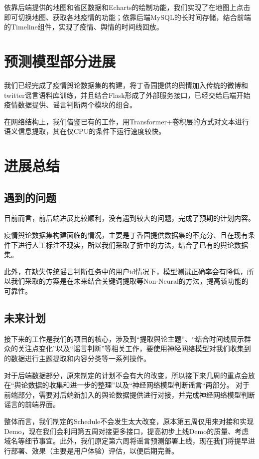 \documentclass{article}
\begin{document}
依靠后端提供的地图和省区数据和Echarts的绘制功能，我们实现了在地图上点击即可切换地图、获取各地疫情的功能；依靠后端MySQL的长时间存储，结合前端的Timeline组件，实现了疫情、舆情的时间线回放。


\section{预测模型部分进展}
我们已经完成了疫情舆论数据集的构建，将丁香园提供的舆情加入传统的微博和twitter谣言语料库训练，并且结合Flask形成了外部服务接口，已经交给后端开始疫情数据提供、谣言判断两个模块的组合。

在网络结构上，我们借鉴已有的工作，用Transformer+卷积层的方式对文本进行语义信息提取，其在仅CPU的条件下运行速度较快。

\section{进展总结}
\subsection{遇到的问题}
目前而言，前后端进展比较顺利，没有遇到较大的问题，完成了预期的计划内容。

疫情舆论数据集构建面临的情况，主要是丁香园提供数据集的不充分、且在现有条件下进行人工标注不现实，所以我们采取了折中的方法，结合了已有的舆论数据集。

此外，在缺失传统谣言判断任务中的用户id情况下，模型测试正确率会有降低，所以我们采取的方案是在未来结合关键词提取等Non-Neural的方法，提高该功能的可靠性。

\subsection{未来计划}
接下来的工作是我们的项目的核心，涉及到“提取舆论主题”、“结合时间线展示群众的关注点变化”以及“谣言判断”等相关工作，要使用神经网络模型对我们收集到的数据进行主题提取和内容分类等一系列操作。

对于后端数据部分，原来制定的计划不会有大的改变，所以接下来几周的重点会放在“舆论数据的收集和进一步的整理”以及“神经网络模型判断谣言“两部分。
对于前端部分，需要对后端新加入的舆论数据提供进行对接，并完成神经网络模型判断谣言的前端界面。

整体而言，我们制定的Schedule不会发生太大改变，原本第五周仅用来对接和实现Demo，现在我们会利用第五周对接更多接口，提高初步上线Demo的质量、考虑域名等细节事宜。此外，我们原定第六周将谣言预测部署上线，现在我们将提早进行部署、效果（主要是用户体验）评估，以便后期完善。
\end{document}
